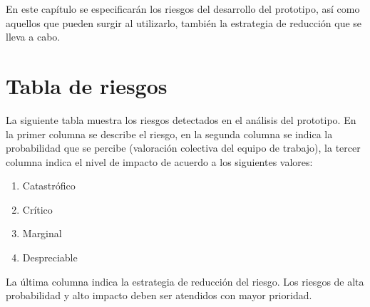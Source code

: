 En este capítulo se especificarán los riesgos del desarrollo del prototipo, así como aquellos
que pueden surgir al utilizarlo, también la estrategia de reducción que se lleva a cabo. 



\section{Tabla de riesgos}
La siguiente tabla muestra los riesgos detectados en el análisis del prototipo.
En la primer columna se describe el riesgo, en la segunda columna se indica la 
probabilidad que se percibe (valoración colectiva del equipo de trabajo), la tercer columna indica el nivel de impacto de acuerdo a los siguientes valores:

\begin{enumerate}
 \item Catastrófico
 \item Crítico
 \item Marginal 
 \item Despreciable
\end{enumerate}

La última columna indica la estrategia de reducción del riesgo. Los riesgos de alta probabilidad y alto impacto deben ser atendidos con mayor prioridad.\\

